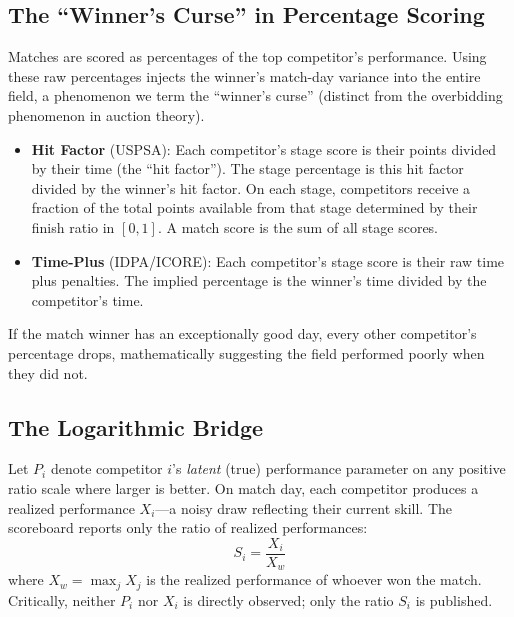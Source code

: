 \documentclass[12pt]{article}
\newcommand{\xwin}{X_w}
\begin{document}
	\subsection{The ``Winner's Curse'' in Percentage Scoring}
	Matches are scored as percentages of the top competitor's performance. Using these raw percentages injects the winner's match-day variance into the entire field, a phenomenon we term the ``winner's curse'' (distinct from the overbidding phenomenon in auction theory).
	\begin{itemize}
		\item \textbf{Hit Factor} (USPSA): Each competitor's stage score is their points divided by their time (the ``hit factor''). The stage percentage is this hit factor divided by the winner's hit factor. On each stage, competitors receive a fraction of the total points available from that stage determined by their finish ratio in \([0, 1]\). A match score is the sum of all stage scores.
		\item \textbf{Time-Plus} (IDPA/ICORE): Each competitor's stage score is their raw time plus penalties. The implied percentage is the winner's time divided by the competitor's time.
	\end{itemize}
	If the match winner has an exceptionally good day, every other competitor's percentage drops, mathematically suggesting the field performed poorly when they did not.

	\subsection{The Logarithmic Bridge}
	Let $P_i$ denote competitor $i$'s \textit{latent} (true) performance parameter on any positive ratio scale where larger is better. On match day, each competitor produces a realized performance $X_i$---a noisy draw reflecting their current skill. The scoreboard reports only the ratio of realized performances:
	\begin{equation}
		S_i = \frac{X_i}{\xwin}
	\end{equation}
	where $\xwin = \max_j X_j$ is the realized performance of whoever won the match. Critically, neither $P_i$ nor $X_i$ is directly observed; only the ratio $S_i$ is published.
\end{document}
